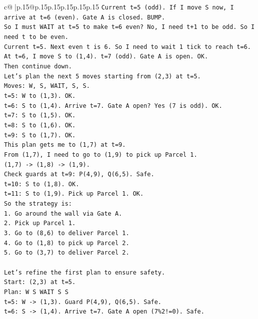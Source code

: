 \documentclass{article}
\begin{document}
{\begin{supertabular}{c@{$\;$}|p{.15\linewidth}@{}p{.15\linewidth}p{.15\linewidth}p{.15\linewidth}p{.15\linewidth}p{.15\linewidth}}
{{{\texttt{Current t=5 (odd). If I move S now, I arrive at t=6 (even). Gate A is closed. BUMP.} \\
\texttt{So I must WAIT at t=5 to make t=6 even? No, I need t+1 to be odd. So I need t to be even.} \\
\texttt{Current t=5. Next even t is 6. So I need to wait 1 tick to reach t=6.} \\
\texttt{At t=6, I move S to (1,4). t=7 (odd). Gate A is open. OK.} \\
\texttt{Then continue down.} \\
\texttt{Let's plan the next 5 moves starting from (2,3) at t=5.} \\
\texttt{Moves: W, S, WAIT, S, S.} \\
\texttt{t=5: W to (1,3). OK.} \\
\texttt{t=6: S to (1,4). Arrive t=7. Gate A open? Yes (7 is odd). OK.} \\
\texttt{t=7: S to (1,5). OK.} \\
\texttt{t=8: S to (1,6). OK.} \\
\texttt{t=9: S to (1,7). OK.} \\
\texttt{This plan gets me to (1,7) at t=9.} \\
\texttt{From (1,7), I need to go to (1,9) to pick up Parcel 1.} \\
\texttt{(1,7) {-}> (1,8) {-}> (1,9).} \\
\texttt{Check guards at t=9: P(4,9), Q(6,5). Safe.} \\
\texttt{t=10: S to (1,8). OK.} \\
\texttt{t=11: S to (1,9). Pick up Parcel 1. OK.} \\
\texttt{So the strategy is:} \\
\texttt{1. Go around the wall via Gate A.} \\
\texttt{2. Pick up Parcel 1.} \\
\texttt{3. Go to (8,6) to deliver Parcel 1.} \\
\texttt{4. Go to (1,8) to pick up Parcel 2.} \\
\texttt{5. Go to (3,7) to deliver Parcel 2.} \\
\\ 
\texttt{Let's refine the first plan to ensure safety.} \\
\texttt{Start: (2,3) at t=5.} \\
\texttt{Plan: W S WAIT S S} \\
\texttt{t=5: W {-}> (1,3). Guard P(4,9), Q(6,5). Safe.} \\
\texttt{t=6: S {-}> (1,4). Arrive t=7. Gate A open (7\%2!=0). Safe.} \\
}}}
\end{supertabular}}
\end{document}

